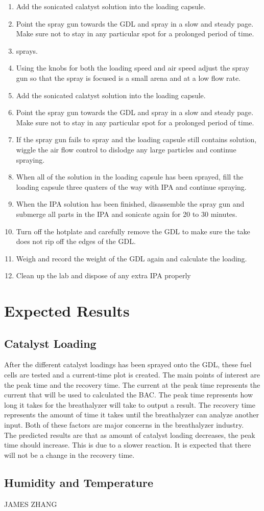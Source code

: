 \documentclass{article}
\begin{document}
\begin{enumerate}
        \item Add the sonicated calatyst solution into the loading capsule.
        \item Point the spray gun towards the GDL and spray in a slow and steady page. Make sure not to stay in any particular spot for a prolonged period of time.
        \item sprays.
        \item Using the knobs for both the loading speed and air speed adjust the spray gun so that the spray is focused is a small arena and at a low flow rate.
        \item Add the sonicated calatyst solution into the loading capsule.
        \item Point the spray gun towards the GDL and spray in a slow and steady page. Make sure not to stay in any particular spot for a prolonged period of time.
        \item If the spray gun fails to spray and the loading capsule still contains solution, wiggle the air flow control to dislodge any large particles and continue spraying.
        \item When all of the solution in the loading capsule has been sprayed, fill the loading capsule three quaters of the way with IPA and continue spraying.
        \item When the IPA solution has been finished, disassemble the spray gun and submerge all parts in the IPA and sonicate again for 20 to 30 minutes.
        \item Turn off the hotplate and carefully remove the GDL to make sure the take does not rip off the edges of the GDL.
        \item Weigh and record the weight of the GDL again and calculate the loading.
        \item Clean up the lab and dispose of any extra IPA properly
			\end{enumerate}
  \section{Expected Results}
    \subsection{Catalyst Loading}
      After the different catalyst loadings has been sprayed onto the GDL, these fuel cells are tested and a current-time plot is created. The main points of interest are the peak time and the recovery time. The current at the peak time represents the current that will be used to calculated the BAC. The peak time represents how long it takes for the breathalyzer will take to output a result. The recovery time represents the amount of time it takes until the breathalyzer can analyze another input. Both of these factors are major concerns in the breathalyzer industry.
      \\
      The predicted results are that as amount of catalyst loading decreases, the peak time should increase. This is due to a slower reaction. It is expected that there will not be a change in the recovery time.
    \subsection{Humidity and Temperature}
      JAMES ZHANG
\end{document}
